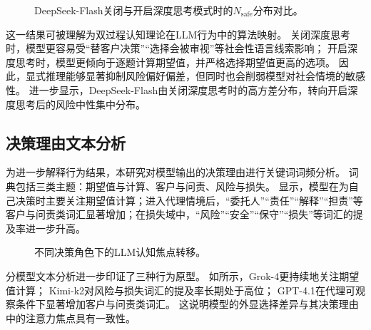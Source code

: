 \documentclass[journal]{vgtc}
\begin{document}
\begin{figure}[!htbp]
  \centering
  \begin{minipage}{0.98\linewidth}
    \centering
    
    \label{fig:deepseek_flash_disabled_repeat}
  \end{minipage}
  \vspace{0.3em}

  \begin{minipage}{0.98\linewidth}
    \centering
    
    \label{fig:deepseek_flash_enabled}
  \end{minipage}
  \caption{DeepSeek-Flash关闭与开启深度思考模式时的$N_{\text{safe}}$分布对比。}
  \label{fig:deepseek_flash_thinking_distributions}
\end{figure}

这一结果可被理解为双过程认知理论在LLM行为中的算法映射。
关闭深度思考时，模型更容易受“替客户决策”“选择会被审视”等社会性语言线索影响；
开启深度思考时，模型更倾向于逐题计算期望值，并严格选择期望值更高的选项。
因此，显式推理能够显著抑制风险偏好偏差，但同时也会削弱模型对社会情境的敏感性。
进一步显示，DeepSeek-Flash由关闭深度思考时的高方差分布，转向开启深度思考后的风险中性集中分布。

\subsection{决策理由文本分析}

为进一步解释行为结果，本研究对模型输出的决策理由进行关键词词频分析。
词典包括三类主题：期望值与计算、客户与问责、风险与损失。
显示，模型在为自己决策时主要关注期望值计算；进入代理情境后，“委托人”“责任”“解释”“担责”等客户与问责类词汇显著增加；在损失域中，“风险”“安全”“保守”“损失”等词汇的提及率进一步升高。

\begin{figure}[!htbp]
  \centering
  
  \caption{不同决策角色下的LLM认知焦点转移。}
  \label{fig:text_analysis}
\end{figure}

分模型文本分析进一步印证了三种行为原型。
如所示，Grok-4更持续地关注期望值计算；
Kimi-k2对风险与损失词汇的提及率长期处于高位；
GPT-4.1在代理可观察条件下显著增加客户与问责类词汇。
这说明模型的外显选择差异与其决策理由中的注意力焦点具有一致性。
\end{document}
